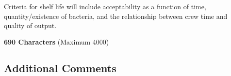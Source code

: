 Criteria for shelf life will include acceptability as a function of time, quantity/existence of bacteria, and the relationship between crew time and quality of output.

\textbf{690 Characters} (Maximum 4000)

\clearpage

\subsection{Additional Comments}


\clearpage

